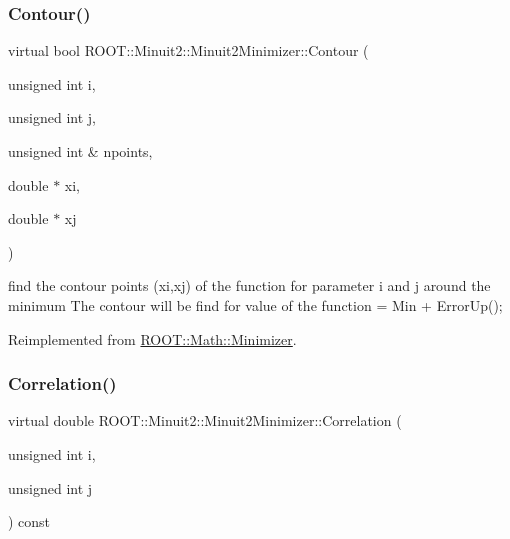 \mbox{\label{classROOT_1_1Minuit2_1_1Minuit2Minimizer_a026780c27dd4b179817f826f49e36c8e}} 
\subsubsection{\texorpdfstring{Contour()}{Contour()}\hspace{0.1cm}{\footnotesize\ttfamily [2/2]}}
{\footnotesize\ttfamily virtual bool R\+O\+O\+T\+::\+Minuit2\+::\+Minuit2\+Minimizer\+::\+Contour (\begin{DoxyParamCaption}\item[{unsigned int}]{i,  }\item[{unsigned int}]{j,  }\item[{unsigned int \&}]{npoints,  }\item[{double $\ast$}]{xi,  }\item[{double $\ast$}]{xj }\end{DoxyParamCaption})\hspace{0.3cm}{\ttfamily [virtual]}}

find the contour points (xi,xj) of the function for parameter i and j around the minimum The contour will be find for value of the function = Min + Error\+Up(); 

Reimplemented from \mbox{\hyperlink{classROOT_1_1Math_1_1Minimizer_aeb8855190ff2e37911c38ed839f2043c}{R\+O\+O\+T\+::\+Math\+::\+Minimizer}}.

\mbox{\label{classROOT_1_1Minuit2_1_1Minuit2Minimizer_a229e82025189e72b5a03cb4e3be19f4a}} 
\subsubsection{\texorpdfstring{Correlation()}{Correlation()}\hspace{0.1cm}{\footnotesize\ttfamily [1/2]}}
{\footnotesize\ttfamily virtual double R\+O\+O\+T\+::\+Minuit2\+::\+Minuit2\+Minimizer\+::\+Correlation (\begin{DoxyParamCaption}\item[{unsigned int}]{i,  }\item[{unsigned int}]{j }\end{DoxyParamCaption}) const\hspace{0.3cm}{\ttfamily [virtual]}}

